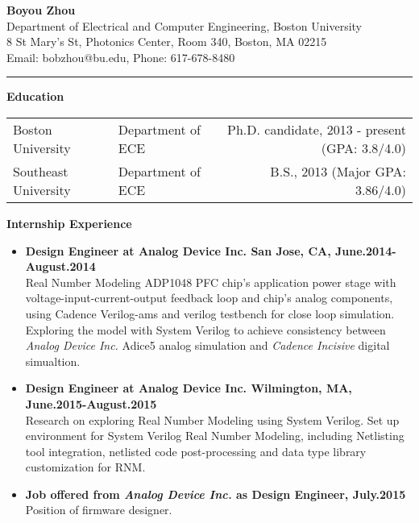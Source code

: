 \documentclass[]{article}
\begin{document}
\pagestyle{empty}
\begin{center}
{\large\textbf{Boyou Zhou}}\\
Department of Electrical and Computer Engineering, Boston University\\
8 St Mary's St, Photonics Center, Room 340, Boston, MA 02215\\
Email: bobzhou@bu.edu, Phone: 617-678-8480\\
\rule[-0.1cm]{7.5in}{0.01cm}
\end{center}
%

\textbf{Education}
\begin{table*}[h]
  \begin{tabular}{p{2.0in}p{2.0in}r}
    Boston University& Department of ECE & Ph.D. candidate, 2013 - present
    (GPA: 3.8/4.0)\\ 
    Southeast University & Department of ECE & B.S., 2013
    (Major GPA: 3.86/4.0)\\ 
  \end{tabular}
  \label{tbl:1}
\end{table*}

\noindent \textbf{Internship Experience}
    \begin{itemize}
        \item \textbf{Design Engineer at Analog Device Inc. San Jose, CA, June.2014-August.2014}\\
        Real Number Modeling ADP1048 PFC chip's application power stage with
        voltage-input-current-output feedback loop and chip's analog components, using Cadence
        Verilog-ams and verilog testbench for close loop simulation. Exploring the model with System
        Verilog to achieve consistency between \textit{Analog Device Inc.} Adice5 analog simulation
        and \textit{Cadence Incisive} digital simualtion. 
        \item \textbf{Design Engineer at Analog Device Inc. Wilmington, MA, June.2015-August.2015}\\
        Research on exploring Real Number Modeling using System Verilog. Set up environment for
        System Verilog Real Number Modeling, including Netlisting tool integration, netlisted code
        post-processing and data type library customization for RNM.
        \item \textbf{Job offered from \textit{Analog Device Inc.} as Design Engineer, July.2015}\\
        Position of firmware designer.
    \end{itemize}
\end{document}
